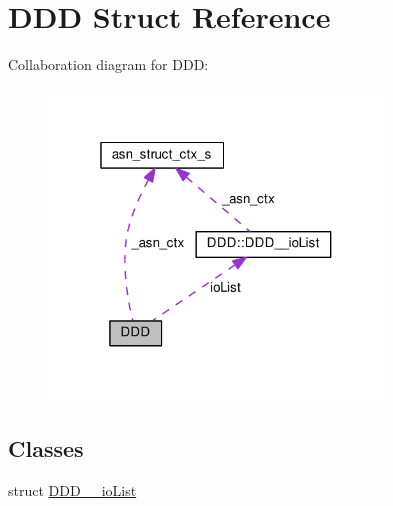 \hypertarget{structDDD}{}\section{D\+DD Struct Reference}
\label{structDDD}


Collaboration diagram for D\+DD\+:\nopagebreak
\begin{figure}[H]
\begin{center}
\leavevmode
\includegraphics[width=253pt]{structDDD__coll__graph}
\end{center}
\end{figure}
\subsection*{Classes}
\begin{DoxyCompactItemize}
\item 
struct \hyperlink{structDDD_1_1DDD____ioList}{D\+D\+D\+\_\+\+\_\+io\+List}
\end{DoxyCompactItemize}
